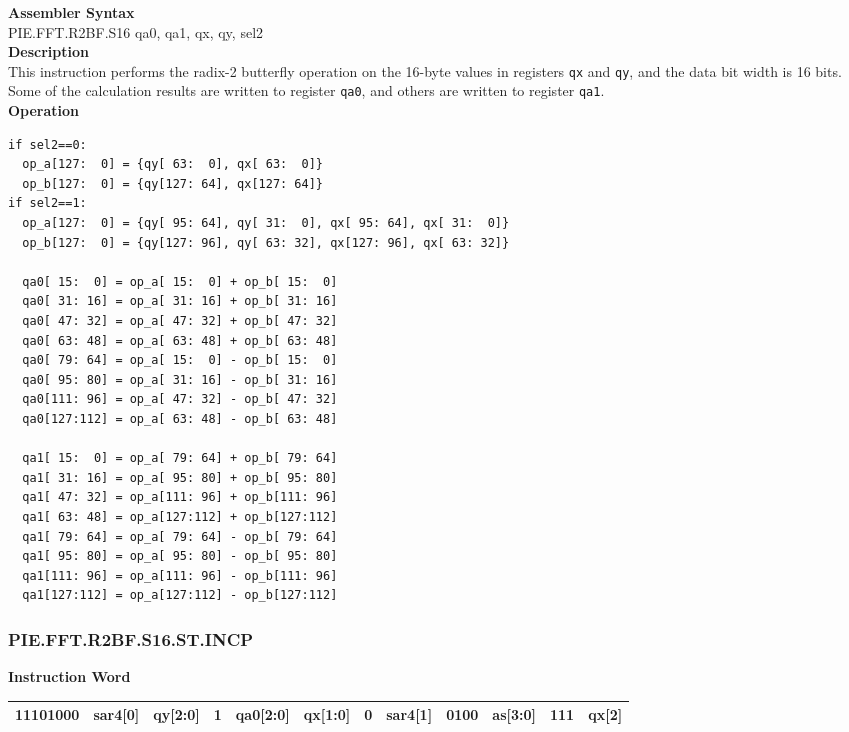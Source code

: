 \textbf{Assembler Syntax} \\
PIE.FFT.R2BF.S16 qa0, qa1, qx, qy, sel2 \\
\textbf{Description} \\
This instruction performs the radix-2 butterfly operation on the 16-byte values in registers \lstinline{qx} and \lstinline{qy}, and the data bit width is 16 bits. Some of the calculation results are written to register \lstinline{qa0}, and others are written to register \lstinline{qa1}.\\
\textbf{Operation}
\begin{lstlisting}
if sel2==0:
  op_a[127:  0] = {qy[ 63:  0], qx[ 63:  0]}
  op_b[127:  0] = {qy[127: 64], qx[127: 64]}
if sel2==1:
  op_a[127:  0] = {qy[ 95: 64], qy[ 31:  0], qx[ 95: 64], qx[ 31:  0]}
  op_b[127:  0] = {qy[127: 96], qy[ 63: 32], qx[127: 96], qx[ 63: 32]}

  qa0[ 15:  0] = op_a[ 15:  0] + op_b[ 15:  0]
  qa0[ 31: 16] = op_a[ 31: 16] + op_b[ 31: 16]
  qa0[ 47: 32] = op_a[ 47: 32] + op_b[ 47: 32]
  qa0[ 63: 48] = op_a[ 63: 48] + op_b[ 63: 48]
  qa0[ 79: 64] = op_a[ 15:  0] - op_b[ 15:  0]
  qa0[ 95: 80] = op_a[ 31: 16] - op_b[ 31: 16]
  qa0[111: 96] = op_a[ 47: 32] - op_b[ 47: 32]
  qa0[127:112] = op_a[ 63: 48] - op_b[ 63: 48]

  qa1[ 15:  0] = op_a[ 79: 64] + op_b[ 79: 64]
  qa1[ 31: 16] = op_a[ 95: 80] + op_b[ 95: 80]
  qa1[ 47: 32] = op_a[111: 96] + op_b[111: 96]
  qa1[ 63: 48] = op_a[127:112] + op_b[127:112]
  qa1[ 79: 64] = op_a[ 79: 64] - op_b[ 79: 64]
  qa1[ 95: 80] = op_a[ 95: 80] - op_b[ 95: 80]
  qa1[111: 96] = op_a[111: 96] - op_b[111: 96]
  qa1[127:112] = op_a[127:112] - op_b[127:112]
\end{lstlisting}

\newpage
\subsubsection{PIE.FFT.R2BF.S16.ST.INCP}\label{instruction:PIEFFTR2BFS16STINCP}
\setlength\tabcolsep{6pt}
\textbf{Instruction Word} \\
\begin{tabular}{|c|c|c|c|c|c|c|c|c|c|c|c|}
	\hline
	11101000 & sar4[0] & qy[2:0] & 1 & qa0[2:0] & qx[1:0] & 0 & sar4[1] & 0100 & as[3:0] & 111 & qx[2] \\
	\hline
\end{tabular}

